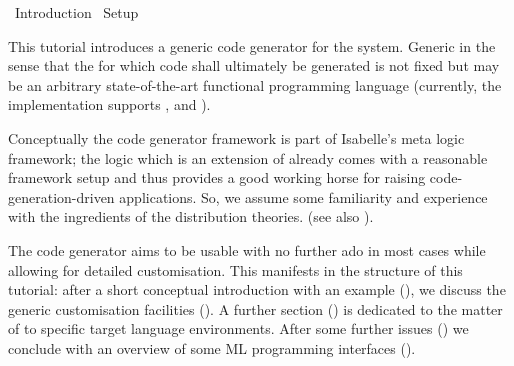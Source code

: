 %
\begin{isabellebody}%
\def\isabellecontext{Introduction}%
%
\isadelimtheory
%
\endisadelimtheory
%
\isatagtheory
{}\isamarkupfalse%
\ Introduction\isanewline
{}\ Setup\isanewline
{}%
\endisatagtheory
{\isafoldtheory}%
%
\isadelimtheory
%
\endisadelimtheory
%
\isamarkuptrue%
%
\begin{isamarkuptext}%
This tutorial introduces a generic code generator for the
   system.
  Generic in the sense that the
   for which code shall ultimately be
  generated is not fixed but may be an arbitrary state-of-the-art
  functional programming language (currently, the implementation
  supports  \cite{SML},  \cite{OCaml} and 
  \cite{haskell-revised-report}).

  Conceptually the code generator framework is part
  of Isabelle's \hyperlink{theory.Pure}{\mbox{}} meta logic framework; the logic
  \hyperlink{theory.HOL}{\mbox{}} which is an extension of \hyperlink{theory.Pure}{\mbox{}}
  already comes with a reasonable framework setup and thus provides
  a good working horse for raising code-generation-driven
  applications.  So, we assume some familiarity and experience
  with the ingredients of the \hyperlink{theory.HOL}{\mbox{}} distribution theories.
  (see also \cite{isa-tutorial}).

  The code generator aims to be usable with no further ado
  in most cases while allowing for detailed customisation.
  This manifests in the structure of this tutorial: after a short
  conceptual introduction with an example (),
  we discuss the generic customisation facilities ().
  A further section () is dedicated to the matter of
   to specific target language environments.  After some
  further issues () we conclude with an overview
  of some ML programming interfaces ().


\end{isamarkuptext}
\end{isabellebody}
